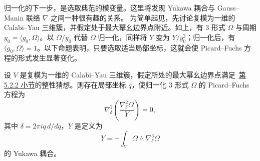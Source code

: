 归一化的下一步，是选取典范的模变量。这里将发现 Yukawa 耦合与 Gauss--Manin 联络 $\nabla$ 之间一种很有趣的关系。
为简单起见，先讨论复模为一维的 Calabi--Yau 三维簇，并假定处于最大幂幺边界点附近。如上，有 $3$ 形式 $\Omega$ 与周期 $y_0=\langle g_0,\Omega\rangle$。以 $\Omega/y_0$ 代替 $\Omega$ 归一化，同样将 $Y$ 变为 $Y/y_0^2$；归一化后，有 $\langle g_0,\Omega\rangle=1$。以下命题表明，只要选取适当局部坐标，这就会使 Picard--Fuchs 方程的形式发生显著变化。
\begin{proposition}\label{prop:normalized-yukawa-pf}
设 $V$ 是复模为一维的 Calabi--Yau 三维簇，假定所处的最大幂幺边界点满足~\hyperref[subsec:higher-dimensional-mum]{第 5.2.2 小节}的整性猜想。则存在局部坐标 $q$，使归一化 $3$ 形式 $\Omega$ 的 Picard--Fuchs 方程为
\[
\nabla_\delta^2\left(\frac{\nabla_\delta^2\Omega}{Y}\right)=0,
\]
其中 $\delta=2\pi iq\,d/dq$，$Y$ 是定义为
\[
Y=-\int_V\Omega\wedge\nabla_\delta^3\Omega
\]
的 Yukawa 耦合。
\end{proposition}
